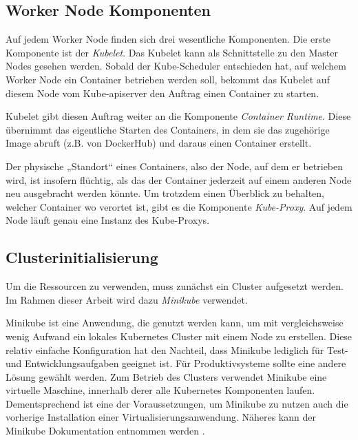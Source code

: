\documentclass[11pt,a4paper]{article}
\begin{document}
\subsection{Worker Node Komponenten}

Auf jedem Worker Node finden sich drei wesentliche Komponenten.
Die erste Komponente ist der \emph{Kubelet}. Das Kubelet kann als Schnittstelle
zu den Master Nodes gesehen werden. Sobald der Kube-Scheduler entschieden hat, auf welchem
Worker Node ein Container betrieben werden soll, bekommt das Kubelet auf diesem Node
vom Kube-apiserver den Auftrag einen Container zu starten.

Kubelet gibt diesen Auftrag weiter an die Komponente \emph{Container Runtime}.
Diese übernimmt das eigentliche Starten des Containers, in dem sie das zugehörige Image
abruft (z.B. von DockerHub) und daraus einen Container erstellt.

Der physische „Standort“ eines Containers, also der Node, auf dem er betrieben wird, ist insofern
flüchtig, als das der Container jederzeit auf einem anderen Node neu ausgebracht werden könnte.
Um trotzdem einen Überblick zu behalten, welcher Container wo verortet ist, gibt es die Komponente
\emph{Kube-Proxy}. Auf jedem Node läuft genau eine Instanz des Kube-Proxys.


\subsection{Clusterinitialisierung}
Um die Ressourcen zu verwenden, muss zunächst ein Cluster aufgesetzt werden.
Im Rahmen dieser Arbeit wird dazu \emph{Minikube} verwendet.

Minikube ist eine Anwendung, die genutzt werden kann, um mit vergleichsweise wenig Aufwand ein lokales
Kubernetes Cluster mit einem Node zu erstellen. Diese relativ einfache Konfiguration hat
den Nachteil, dass Minikube lediglich für Test- und Entwicklungsaufgaben geeignet ist.
Für Produktivsysteme sollte eine andere Lösung gewählt werden. %
Zum Betrieb des Clusters verwendet Minikube eine virtuelle Maschine, innerhalb derer
alle Kubernetes Komponenten laufen. Dementsprechend ist eine der Voraussetzungen,
um Minikube zu nutzen auch die vorherige Installation einer Virtualisierungsanwendung.
Näheres kann der Minikube Dokumentation entnommen werden \cite{minikube}.
\end{document}
